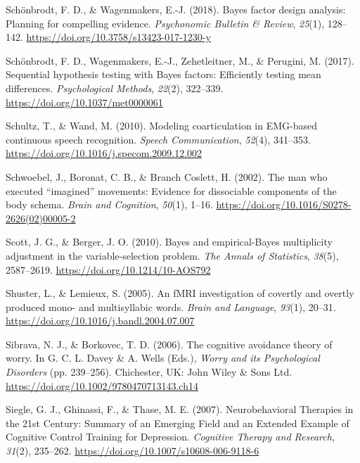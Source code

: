 \documentclass[a4paper,12pt,twoside,onecolumn,openright,final,oldfontcommands]{memoir}
\begin{document}
\leavevmode\hypertarget{ref-schonbrodt_bayes_2018}{}%
Schönbrodt, F. D., \& Wagenmakers, E.-J. (2018). Bayes factor design analysis: Planning for compelling evidence. \emph{Psychonomic Bulletin \& Review}, \emph{25}(1), 128--142. \url{https://doi.org/10.3758/s13423-017-1230-y}

\leavevmode\hypertarget{ref-schonbrodt_sequential_2017}{}%
Schönbrodt, F. D., Wagenmakers, E.-J., Zehetleitner, M., \& Perugini, M. (2017). Sequential hypothesis testing with Bayes factors: Efficiently testing mean differences. \emph{Psychological Methods}, \emph{22}(2), 322--339. \url{https://doi.org/10.1037/met0000061}

\leavevmode\hypertarget{ref-schultz_modeling_2010}{}%
Schultz, T., \& Wand, M. (2010). Modeling coarticulation in EMG-based continuous speech recognition. \emph{Speech Communication}, \emph{52}(4), 341--353. \url{https://doi.org/10.1016/j.specom.2009.12.002}

\leavevmode\hypertarget{ref-schwoebel_man_2002}{}%
Schwoebel, J., Boronat, C. B., \& Branch Coslett, H. (2002). The man who executed ``imagined'' movements: Evidence for dissociable components of the body schema. \emph{Brain and Cognition}, \emph{50}(1), 1--16. \url{https://doi.org/10.1016/S0278-2626(02)00005-2}

\leavevmode\hypertarget{ref-scott_bayes_2010}{}%
Scott, J. G., \& Berger, J. O. (2010). Bayes and empirical-Bayes multiplicity adjustment in the variable-selection problem. \emph{The Annals of Statistics}, \emph{38}(5), 2587--2619. \url{https://doi.org/10.1214/10-AOS792}

\leavevmode\hypertarget{ref-shuster_fmri_2005}{}%
Shuster, L., \& Lemieux, S. (2005). An fMRI investigation of covertly and overtly produced mono- and multisyllabic words. \emph{Brain and Language}, \emph{93}(1), 20--31. \url{https://doi.org/10.1016/j.bandl.2004.07.007}

\leavevmode\hypertarget{ref-davey_cognitive_2006}{}%
Sibrava, N. J., \& Borkovec, T. D. (2006). The cognitive avoidance theory of worry. In G. C. L. Davey \& A. Wells (Eds.), \emph{Worry and its Psychological Disorders} (pp. 239--256). Chichester, UK: John Wiley \& Sons Ltd. \url{https://doi.org/10.1002/9780470713143.ch14}

\leavevmode\hypertarget{ref-siegle_neurobehavioral_2007}{}%
Siegle, G. J., Ghinassi, F., \& Thase, M. E. (2007). Neurobehavioral Therapies in the 21st Century: Summary of an Emerging Field and an Extended Example of Cognitive Control Training for Depression. \emph{Cognitive Therapy and Research}, \emph{31}(2), 235--262. \url{https://doi.org/10.1007/s10608-006-9118-6}
\end{document}
